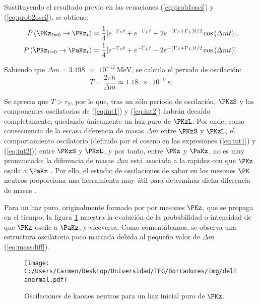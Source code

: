 Sustituyendo el resultado previo en las ecuaciones (\ref{eq:prob1osci}) y (\ref{eq:prob2osci}), se obtiene:
\begin{align}
P\left(\PKz_{t=0} \rightarrow \PKz_{t}\right) &= \dfrac{1}{4}[e^{-\Gamma_{S}t}+e^{-\Gamma_{L}t}+ 2e^{-\left(\Gamma_{S}+\Gamma_{L}\right)t/2} \cos \left(\Delta mt\right)],\label{eq:int1} \\
P\left(\PKz_{t=0} \rightarrow \PaKz_{t}\right) &= \dfrac{1}{4}[e^{-\Gamma_{S}t}+e^{-\Gamma_{L}t}-2e^{-\left(\Gamma_{S}+\Gamma_{L}\right)t/2} \cos \left(\Delta mt\right)].\label{eq:int2}
\end{align}

Sabiendo que $\Delta m = \SI{3,498e-12}{\MeV}$, se calcula el periodo de oscilación:
\begin{equation}
T=\dfrac{2\pi\hbar}{\Delta m} \simeq \SI{1.18e-9}{\second}.
\end{equation}

Se aprecia que $T>\tau_{S}$, por lo que, tras un sólo periodo de oscilación, $\PKzS$ y las componentes oscilatorias de (\ref{eq:int1}) y (\ref{eq:int2}) habrán decaído completamente, quedando únicamente un haz puro de $\PKzL$. Por ende, como consecuencia de la escasa diferencia de masas $\Delta m$ entre $\PKzS$ y $\PKzL$, el comportamiento oscilatorio (definido por el coseno en las expresiones (\ref{eq:int1}) y (\ref{eq:int2})) entre $\PKzS$ y $\PKzL$, y por tanto, entre $\PKz$ y $\PaKz$, no es muy pronunciado: la diferencia de masas $\Delta m$ está asociada a la rapidez con que $\PKz$ oscila a $\PaKz$ \cite{Perkins}. Por ello, el estudio de oscilaciones de sabor en los mesones $\PK$ neutros proporciona una herramienta muy útil para determinar dicha diferencia de masas \cite{Thomson}. 

Para un haz puro, originalmente formado por por mesones $\PKz$, que se propaga en el tiempo, la figura \ref{fig:oscillation2} muestra la evolución de la probabilidad o intensidad de que $\PKz$ oscile a $\PaKz$, y viceversa. Como comentábamos, se observa una estructura oscilatoria poco marcada debida al pequeño valor de $\Delta m$ (\ref{eq:massdiff}).

\begin{figure}[!ht]
	\centering
	\texttt{[image: C:/Users/Carmen/Desktop/Universidad/TFG/Borradores/img/deltanormal.pdf]}
	\caption[Efecto de las oscilaciones en mesones $\PK$ neutros.]
	{Oscilaciones de kaones neutros para un haz inicial puro de $\PKz$.}
	\label{fig:oscillation2}
\end{figure}

